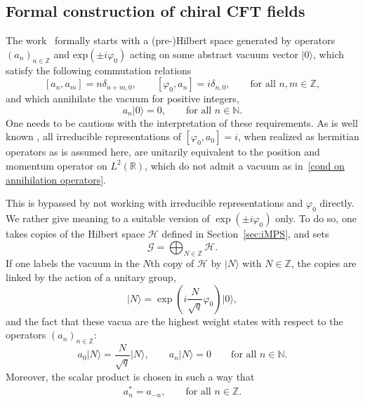 \documentclass[letterpaper, DIV=17]{scrartcl}
\numberwithin{equation}{section}
\theoremstyle{definition}
\begin{document}
		\subsection{Formal construction of chiral CFT fields}
		The work~\cite{estienne2013fractional} formally starts with a (pre-)Hilbert space generated by operators $(a_n)_{n\in \mathbb{Z}}$ and $\mathrm{exp}(\pm i \varphi_0)$ acting on some abstract vacuum vector $\vert 0 \rangle$, which satisfy the following commutation relations
		\begin{equation} \label{commutation relation 2}
			[a_n, a_m] = n \delta_{n+m,0}, \qquad [\varphi_0, a_n] = i \delta_{n,0}, \qquad \text{for all } n,m \in \mathbb{Z} ,
		\end{equation}
		and which annihilate the vacuum for positive integers, 
		\begin{equation} \label{cond on annihilation operators}
			a_n \vert 0 \rangle = 0, \qquad \text{for all } n\in \mathbb{N}.
		\end{equation}
		One needs to be cautious with the interpretation of these requirements. 
			As is well known  \cite{vonNeumann1931eindeutigkeit}, all irreducible representations of $[\varphi_0, a_0] =i$, when realized as hermitian operators as is assumed here,  are unitarily equivalent to the position and momentum operator on $L^2(\mathbb{R})$, which do not admit a vacuum as in~\eqref{cond on annihilation operators}. 
			
			This is bypassed by not working with irreducible representations and $ \varphi_0 $ directly. We rather give meaning to a suitable version of $\exp(\pm i \varphi_0)$ only. To do so, 
one takes copies of the Hilbert space $ \mathcal{H} $  defined in Section~\ref{sec:iMPS}, and sets
		\begin{equation}\label{eq:directsumG}
			 \mathcal{G} = \bigoplus_{N\in \mathbb{Z}} \mathcal{H}. 
		\end{equation}
		If one labels the vacuum in the $ N $th copy of $ \mathcal{H} $ by $ | N \rangle $ with $ N \in \mathbb{Z} $, the copies are linked by the action of a unitary group, 
		$$
			\vert N\rangle = \exp\left(i \frac{N}{\sqrt{q}}\varphi_0\right) \vert 0 \rangle ,  
		$$
		and the fact that these vacua are the highest weight states with respect to the operators $(a_n)_{n\in \mathbb{Z}}$:
		$$
		a_0 \vert N \rangle = \frac{N}{\sqrt{q}} \vert N \rangle, \qquad a_n \vert N \rangle = 0 \qquad \text{for all } n\in \mathbb{N} . 
		$$	
		Moreover, the scalar product is chosen in such a way that
		\begin{align*}
			a_n^*= a_{-n}, \qquad \text{for all } n\in \mathbb{Z} . 
		\end{align*}
\end{document}
